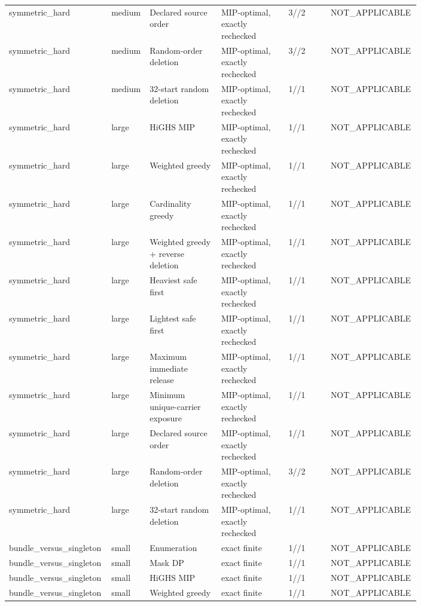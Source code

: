 {\begin{longtable}{p{0.18\linewidth}p{0.07\linewidth}p{0.17\linewidth}p{0.16\linewidth}p{0.10\linewidth}p{0.12\linewidth}}
symmetric\_hard & medium & Declared source order & MIP-optimal, exactly rechecked & 3//2 & NOT\_APPLICABLE \\
symmetric\_hard & medium & Random-order deletion & MIP-optimal, exactly rechecked & 3//2 & NOT\_APPLICABLE \\
symmetric\_hard & medium & 32-start random deletion & MIP-optimal, exactly rechecked & 1//1 & NOT\_APPLICABLE \\
symmetric\_hard & large & HiGHS MIP & MIP-optimal, exactly rechecked & 1//1 & NOT\_APPLICABLE \\
symmetric\_hard & large & Weighted greedy & MIP-optimal, exactly rechecked & 1//1 & NOT\_APPLICABLE \\
symmetric\_hard & large & Cardinality greedy & MIP-optimal, exactly rechecked & 1//1 & NOT\_APPLICABLE \\
symmetric\_hard & large & Weighted greedy + reverse deletion & MIP-optimal, exactly rechecked & 1//1 & NOT\_APPLICABLE \\
symmetric\_hard & large & Heaviest safe first & MIP-optimal, exactly rechecked & 1//1 & NOT\_APPLICABLE \\
symmetric\_hard & large & Lightest safe first & MIP-optimal, exactly rechecked & 1//1 & NOT\_APPLICABLE \\
symmetric\_hard & large & Maximum immediate release & MIP-optimal, exactly rechecked & 1//1 & NOT\_APPLICABLE \\
symmetric\_hard & large & Minimum unique-carrier exposure & MIP-optimal, exactly rechecked & 1//1 & NOT\_APPLICABLE \\
symmetric\_hard & large & Declared source order & MIP-optimal, exactly rechecked & 1//1 & NOT\_APPLICABLE \\
symmetric\_hard & large & Random-order deletion & MIP-optimal, exactly rechecked & 3//2 & NOT\_APPLICABLE \\
symmetric\_hard & large & 32-start random deletion & MIP-optimal, exactly rechecked & 1//1 & NOT\_APPLICABLE \\
bundle\_versus\_singleton & small & Enumeration & exact finite & 1//1 & NOT\_APPLICABLE \\
bundle\_versus\_singleton & small & Mask DP & exact finite & 1//1 & NOT\_APPLICABLE \\
bundle\_versus\_singleton & small & HiGHS MIP & exact finite & 1//1 & NOT\_APPLICABLE \\
bundle\_versus\_singleton & small & Weighted greedy & exact finite & 1//1 & NOT\_APPLICABLE \\

\end{longtable}}
